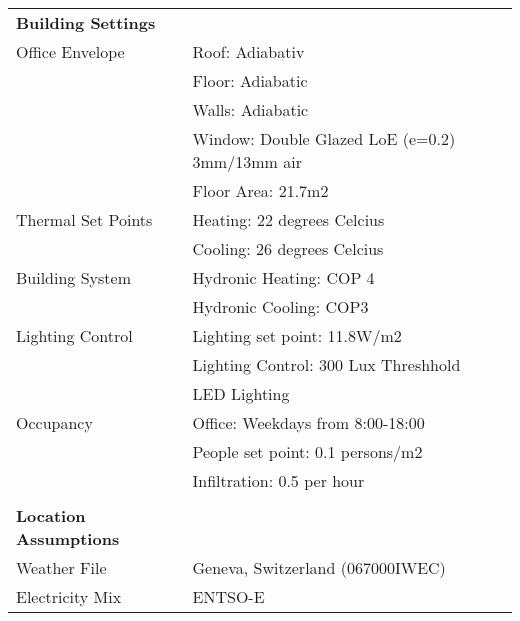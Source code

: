 \begin{table}[H]
\centering
\begin{tabular}{ll}

\textbf{Building Settings}    &                                                \\
Office Envelope               & Roof: Adiabativ                                \\
                              & Floor: Adiabatic                               \\
                              & Walls: Adiabatic                               \\
                              & Window: Double Glazed LoE (e=0.2) 3mm/13mm air \\
                              & Floor Area: 21.7m2                             \\
Thermal Set Points            & Heating: 22 degrees Celcius                    \\
                              & Cooling: 26 degrees Celcius                    \\
Building System               & Hydronic Heating: COP 4                        \\
                              & Hydronic Cooling: COP3                         \\
Lighting Control              & Lighting set point: 11.8W/m2                   \\
                              & Lighting Control: 300 Lux Threshhold           \\
                              & LED Lighting                                   \\
Occupancy                     & Office: Weekdays from 8:00-18:00               \\
                              & People set point: 0.1 persons/m2               \\
                              & Infiltration: 0.5 per hour                     \\
                              &                                                \\
\textbf{Location Assumptions} &                                                \\
Weather File                  & Geneva, Switzerland (067000IWEC)              \\
Electricity Mix               & ENTSO-E                                           \\

\end{tabular}
\end{table}
